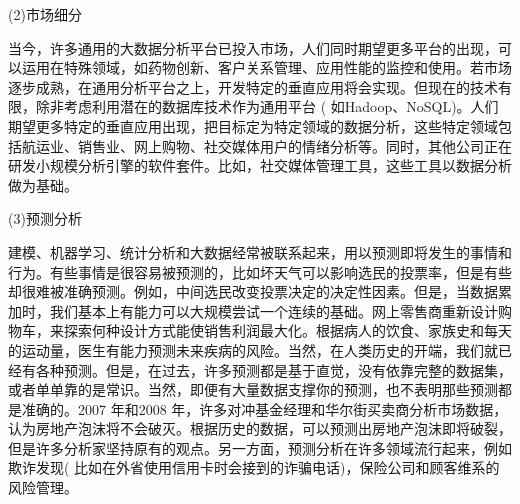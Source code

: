 (2)市场细分

当今，许多通用的大数据分析平台已投入市场，人们同时期望更多平台的出现，可以运用在特殊领域，如药物创新、客户关系管理、应用性能的监控和使用。若市场逐步成熟，在通用分析平台之上，开发特定的垂直应用将会实现。但现在的技术有限，除非考虑利用潜在的数据库技术作为通用平台 ( 如Hadoop、NoSQL)。人们期望更多特定的垂直应用出现，把目标定为特定领域的数据分析，这些特定领域包括航运业、销售业、网上购物、社交媒体用户的情绪分析等。同时，其他公司正在研发小规模分析引擎的软件套件。比如，社交媒体管理工具，这些工具以数据分析做为基础。

(3)预测分析

建模、机器学习、统计分析和大数据经常被联系起来，用以预测即将发生的事情和行为。有些事情是很容易被预测的，比如坏天气可以影响选民的投票率，但是有些却很难被准确预测。例如，中间选民改变投票决定的决定性因素。但是，当数据累加时，我们基本上有能力可以大规模尝试一个连续的基础。网上零售商重新设计购物车，来探索何种设计方式能使销售利润最大化。根据病人的饮食、家族史和每天的运动量，医生有能力预测未来疾病的风险。当然，在人类历史的开端，我们就已经有各种预测。但是，在过去，许多预测都是基于直觉，没有依靠完整的数据集，或者单单靠的是常识。当然，即便有大量数据支撑你的预测，也不表明那些预测都是准确的。2007 年和2008 年，许多对冲基金经理和华尔街买卖商分析市场数据，认为房地产泡沫将不会破灭。根据历史的数据，可以预测出房地产泡沫即将破裂，但是许多分析家坚持原有的观点。另一方面，预测分析在许多领域流行起来，例如欺诈发现( 比如在外省使用信用卡时会接到的诈骗电话)，保险公司和顾客维系的风险管理。




